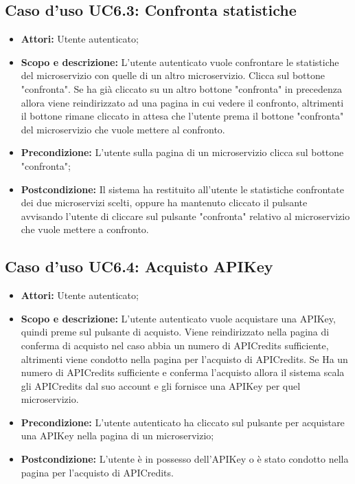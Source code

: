 \documentclass[12pt,a4paper,titlepage]{article}
\begin{document}
	\subsection{Caso d'uso UC6.3: Confronta statistiche}
	\label{UC6.3}
	\begin{itemize}
		\item \textbf{Attori: }Utente autenticato;
		\item \textbf{Scopo e descrizione: }L'utente autenticato vuole confrontare le statistiche del microservizio con quelle di un altro microservizio. Clicca sul bottone "confronta". Se ha già cliccato su un altro bottone "confronta" in precedenza allora viene reindirizzato ad una pagina in cui vedere il confronto, altrimenti il bottone rimane cliccato in attesa che l'utente prema il bottone "confronta" del microservizio che vuole mettere al confronto.
		\item \textbf{Precondizione: }L'utente sulla pagina di un microservizio clicca sul bottone "confronta";
		\item \textbf{Postcondizione: }Il sistema ha restituito all'utente le statistiche confrontate dei due microservizi scelti, oppure ha mantenuto cliccato il pulsante avvisando l'utente di cliccare sul pulsante "confronta" relativo al microservizio che vuole mettere a confronto.
	\end{itemize}
	\subsection{Caso d'uso UC6.4: Acquisto APIKey}
	\label{UC6.4}
	\begin{itemize}
		\item \textbf{Attori: }Utente autenticato;
		\item \textbf{Scopo e descrizione: }L'utente autenticato vuole acquistare una APIKey, quindi preme sul pulsante di acquisto. Viene reindirizzato nella pagina di conferma di acquisto nel caso abbia un numero di APICredits sufficiente, altrimenti viene condotto nella pagina per l'acquisto di APICredits. Se Ha un numero di APICredits sufficiente e conferma l'acquisto allora il sistema scala gli APICredits dal suo account e gli fornisce una APIKey per quel microservizio.
		\item \textbf{Precondizione: }L'utente autenticato ha cliccato sul pulsante per acquistare una APIKey nella pagina di un microservizio;
		\item \textbf{Postcondizione: }L'utente è in possesso dell'APIKey o è stato condotto nella pagina per l'acquisto di APICredits.
	\end{itemize}
\end{document}
